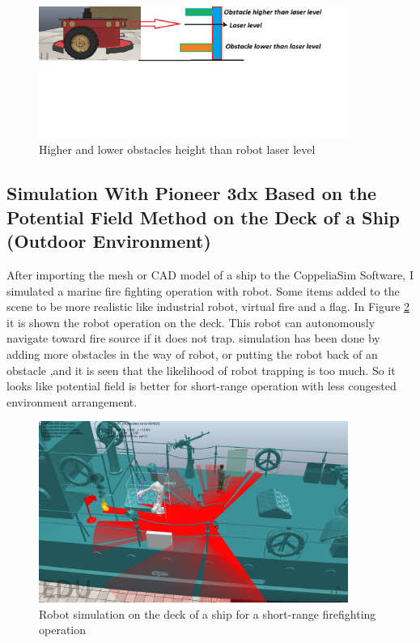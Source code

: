\begin{itemize}
\begin{figure}[H]
  \centering
  \includegraphics[width= 0.9\textwidth]{Figures/Laser level.png}
  \caption[Higher and lower obstacles height than robot laser level]{Higher and lower obstacles height than robot laser level}
   \label{fig:Higher and lower obstacles height than robot laser level}
\end{figure}
       
\end{itemize}




\subsection{Simulation With Pioneer 3dx Based on the Potential Field Method on the Deck of a Ship (Outdoor Environment) }
\noindent After importing the mesh or CAD model of a ship to the CoppeliaSim Software, I simulated a marine fire fighting operation with robot. Some items added to the scene to be more realistic like industrial robot, virtual fire and a flag. In Figure 
\ref{fig:Robot simulation on the deck of a ship for a short-range firefighting operation} it is shown the robot operation on the deck. This robot can autonomously navigate toward fire source if it does not trap. simulation has been done by adding more obstacles in the way of robot, or putting the robot back of an obstacle ,and it is seen that the likelihood of robot trapping is too much.  So it looks like potential field is better for short-range operation with less congested environment arrangement. \\
\begin{figure}[H]
  \centering
  \includegraphics[width= 0.9\textwidth]{Figures/shipAPFSIM.PNG}
  \caption[Robot simulation on the deck of a ship for a short-range firefighting operation]{Robot simulation on the deck of a ship for a short-range firefighting operation}
   \label{fig:Robot simulation on the deck of a ship for a short-range firefighting operation}
\end{figure}


